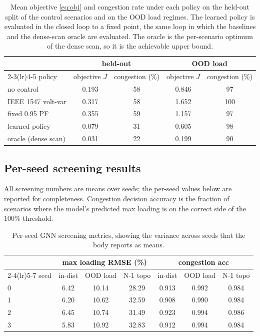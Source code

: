 \documentclass{article}
\begin{document}
\begin{table}[ht]
  \centering
  \small
  \begin{tabular}{lcccc}
    \toprule
    & \multicolumn{2}{c}{held-out} & \multicolumn{2}{c}{OOD load} \\
    \cmidrule(lr){2-3}\cmidrule(lr){4-5}
    policy & objective $J$ & congestion (\%) & objective $J$ & congestion (\%) \\
    \midrule
    no control & 0.193 & 58 & 0.846 & 97 \\
    IEEE 1547 volt-var & 0.317 & 58 & 1.652 & 100 \\
    fixed 0.95 PF & 0.355 & 59 & 1.157 & 97 \\
    learned policy & 0.079 & 31 & 0.605 & 98 \\
    oracle (dense scan) & 0.031 & 22 & 0.199 & 90 \\
    \bottomrule
  \end{tabular}
  \caption{Mean objective \eqref{eq:obj} and congestion rate under each
  policy on the held-out split of the control scenarios and on the OOD
  load regimes. The learned policy is evaluated in the closed loop to a
  fixed point, the same loop in which the baselines and the dense-scan
  oracle are evaluated. The oracle is the per-scenario optimum of the
  dense scan, so it is the achievable upper bound.}
  \label{tab:control}
\end{table}

\subsection{Per-seed screening results}
All screening numbers are means over seeds; the per-seed values below are
reported for completeness. Congestion decision accuracy is the fraction of
scenarios where the model's predicted max loading is on the correct side of
the $100\%$ threshold.

\begin{table}[ht]
  \centering
  \small
  \begin{tabular}{lccc|ccc}
    \toprule
    & \multicolumn{3}{c}{max loading RMSE (\%)} & \multicolumn{3}{c}{congestion acc} \\
    \cmidrule(lr){2-4}\cmidrule(lr){5-7}
    seed & in-dist & OOD load & N-1 topo & in-dist & OOD load & N-1 topo \\
    \midrule
    0 & 6.42 & 10.14 & 28.29 & 0.913 & 0.992 & 0.984 \\
    1 & 6.20 & 10.62 & 32.59 & 0.908 & 0.990 & 0.984 \\
    2 & 6.45 & 10.74 & 31.49 & 0.923 & 0.994 & 0.986 \\
    3 & 5.83 & 10.92 & 32.83 & 0.912 & 0.994 & 0.984 \\
    \bottomrule
  \end{tabular}
  \caption{Per-seed GNN screening metrics, showing the variance across
  seeds that the body reports as means.}
  \label{tab:perseed_screen}
\end{table}
\end{document}
